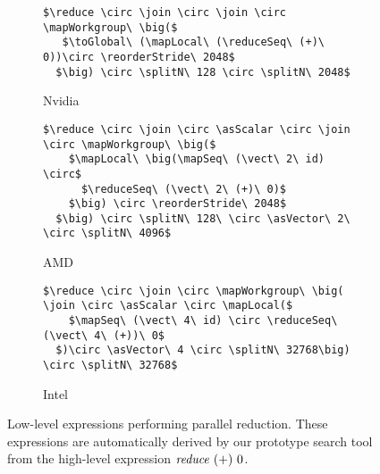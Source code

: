 \begin{figure*}[t]
\captionsetup[subfigure]{justification=justified,singlelinecheck=false}

\begin{subfigure}[b]{\linewidth}
\vspace{.4em}
\begin{minipage}{.15\linewidth}
\caption{Nvidia}
\label{fig:reduce:expr:auto:1}
\end{minipage}
\hfill
\begin{minipage}{.8\linewidth}
\begin{lstlisting}[mathescape, basicstyle=\small\rmfamily]
$\reduce \circ \join \circ \join \circ \mapWorkgroup\ \big($
   $\toGlobal\ (\mapLocal\ (\reduceSeq\ (+)\ 0))\circ \reorderStride\ 2048$
  $\big) \circ \splitN\ 128 \circ \splitN\ 2048$
\end{lstlisting}
\end{minipage}
\end{subfigure}

\begin{subfigure}[b]{\linewidth}
\vspace{0em}
\begin{minipage}{.15\linewidth}
\caption{AMD}
\label{fig:reduce:expr:auto:2}
\end{minipage}
\hfill
\begin{minipage}{.8\linewidth}
\begin{lstlisting}[mathescape, basicstyle=\small\rmfamily]
$\reduce \circ \join \circ \asScalar \circ \join \circ \mapWorkgroup\ \big($
    $\mapLocal\ \big(\mapSeq\ (\vect\ 2\ id) \circ$
      $\reduceSeq\ (\vect\ 2\ (+)\ 0)$
    $\big) \circ \reorderStride\ 2048$
  $\big) \circ \splitN\ 128\ \circ \asVector\ 2\ \circ \splitN\ 4096$
\end{lstlisting}
\end{minipage}
\end{subfigure}

\begin{subfigure}[b]{\linewidth}
\vspace{0em}
\begin{minipage}{.15\linewidth}
\caption{Intel}
\label{fig:reduce:expr:auto:3}
\end{minipage}
\hfill
\begin{minipage}{.8\linewidth}
\begin{lstlisting}[mathescape, basicstyle=\small\rmfamily]
$\reduce \circ \join \circ \mapWorkgroup\ \big( \join \circ \asScalar \circ \mapLocal($
    $\mapSeq\ (\vect\ 4\ id) \circ \reduceSeq\ (\vect\ 4\ (+))\ 0$
  $)\circ \asVector\ 4 \circ \splitN\ 32768\big) \circ \splitN\ 32768$
\end{lstlisting}
\end{minipage}
\end{subfigure}

\caption{Low-level expressions performing parallel reduction. These expressions are automatically derived by our prototype search tool from the  high-level expression $\reduce\ (+)\ 0$.}
\label{fig:reduce:expr:auto}
\end{figure*}

